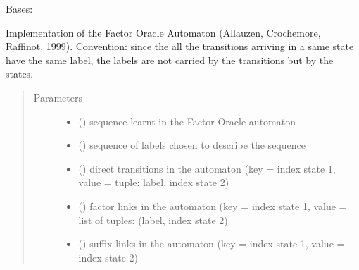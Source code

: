 \documentclass[letterpaper,10pt,english]{sphinxmanual}
\begin{document}
\begin{fulllineitems}
\label{\detokenize{index:Model.FactorOracle}}
Bases: {\hyperref[\detokenize{index:Model.Model}]{}}

Implementation of the Factor Oracle Automaton (Allauzen, Crochemore, Raffinot, 1999).
Convention: since the all the transitions arriving in a same state have the same label, 
the labels are not carried by the transitions but by the states.
\begin{quote}\begin{description}
\item[{Parameters}] \leavevmode\begin{itemize}
\item {} 
 () \textendash{} sequence learnt in the Factor Oracle automaton

\item {} 
 () \textendash{} sequence of labels chosen to describe the sequence

\item {} 
 () \textendash{} direct transitions in the automaton (key = index state 1, value = tuple: label, index state 2)

\item {} 
 () \textendash{} factor links in the automaton (key = index state 1, value = list of tuples: (label, index state 2)

\item {} 
 () \textendash{} suffix links in the automaton (key = index state 1, value = index state 2)


\end{itemize}
\end{description}
\end{quote}
\end{fulllineitems}
\end{document}
